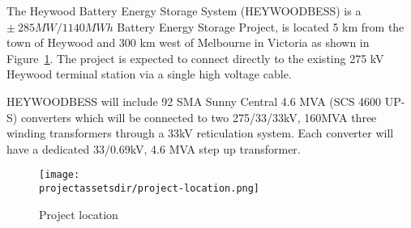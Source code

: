 The Heywood Battery Energy Storage System (HEYWOODBESS) is a $\pm~285MW/1140MWh$ Battery Energy Storage Project, is located 5 km from the town of Heywood and 300 km west of Melbourne in Victoria as shown in Figure~\ref{fig:project-location}. The project is expected to connect directly to the existing 275 kV Heywood terminal station via a single high voltage cable.

HEYWOODBESS will include 92 SMA Sunny Central 4.6 MVA (SCS 4600 UP-S) converters which will be connected to two 275/33/33kV, 160MVA three winding transformers through a 33kV reticulation system. Each converter will have a dedicated 33/0.69kV, 4.6 MVA step up transformer.


\begin{figure}[H]
	\centering
	\texttt{[image: \\projectassetsdir/project-location.png]} %
	\caption{Project location}
	\label{fig:project-location}
\end{figure}

